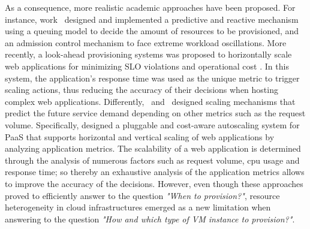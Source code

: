 
As a consequence, more realistic academic approaches have been proposed. For instance, work~\cite{urgaonkar_agile_2008} designed and implemented a predictive and reactive mechanism using a queuing model to decide the amount of resources to be provisioned, and an admission control mechanism to face extreme workload oscillations. More recently, a look-ahead provisioning systems was proposed to horizontally scale web applications for minimizing SLO violations and operational cost \cite{roy_efficient_2011}. In this system, the application's response time was used as the unique metric to trigger scaling actions, thus reducing the accuracy of their decisions when hosting complex web applications. Differently,~\cite{ali-eldin_2012} and~\cite{bunch_2012} designed scaling mechanisms that predict the future service demand depending on other metrics such as the request volume. Specifically, \cite{bunch_2012} designed a pluggable and cost-aware autoscaling system for PaaS that supports horizontal and vertical scaling of web applications by analyzing application metrics. The scalability of a web application is determined through the analysis of numerous factors such as request volume, cpu usage and response time; so thereby an exhaustive analysis of the application metrics allows to improve the accuracy of the decisions. However, even though these approaches proved to efficiently answer to the question \emph{"When to provision?"}, resource heterogeneity in cloud infrastructures emerged as a new limitation when answering to the question \emph{"How and which type of VM instance to provision?"}.





